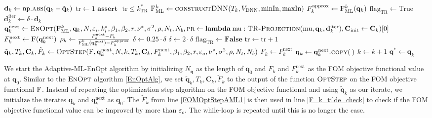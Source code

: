 \begin{algorithm}[H]
\begin{algorithmic}[1]
\State\label{d_kDefAML} $\mathbf{d}_k\gets\mathrm{np.}\Call{abs}{\mathbf{q}_k-\tilde{\mathbf{q}}_k}$
\State $\mathrm{tr}\gets1$
\State $\mathbf{assert}\text{ }\mathrm{tr}\leq k^*_\mathrm{TR}$
\State\label{surrogateDefAML} $\textproc{F$_\mathrm{ML}^k$}\gets \Call{constructDNN}{T_k, V_\mathrm{DNN}, \mathrm{minIn}, \mathrm{maxIn}}$
\State $F^\mathrm{approx}_k\gets \Call{F$_\mathrm{ML}^k$}{\mathbf{q}_k}$
\State $\mathrm{flag}_\mathrm{TR}\gets \mathrm{True}$
\State $\mathbf{d}^\mathrm{iter}_k\gets\delta\cdot\mathbf{d}_k$
\State\label{innerIterationCallAlgo} $\mathbf{q}^\mathrm{next}_k\gets\Call{EnOpt}{\textproc{F$_\mathrm{ML}^k$},\mathbf{q}_k,N,\varepsilon_i,k_i^*,\beta_1, \beta_2,r,\nu^*, \sigma^2, \rho, N_t, N_b, \textproc{pr}\gets\mathbf{lambda}\:\mathrm{mu}:\protect\Call{TR-Projection}{\mathrm{mu}, \mathbf{q}_k, \mathbf{d}^\mathrm{iter}_k}, \mathbf{C}_\mathrm{init}\gets\mathbf{C}_k}[0]$
\State\label{AMLFOMEval2} $F^\mathrm{next}_k\gets \Call{F}{\mathbf{q}^\mathrm{next}_k}$
\State\label{rhoKDef} $\rho_k\gets \frac{F^\mathrm{next}_k-F_k}{\Call{F$_\mathrm{ML}^k$}{\mathbf{q}^\mathrm{next}_k}-F^\mathrm{approx}_k}$
\State $\delta\gets0.25\cdot\delta$
\Else
{}
\State $\delta\gets2\cdot\delta$
\EndIf
\EndIf
{}
\State $\mathrm{flag}_\mathrm{TR}\gets\mathbf{False}$
\EndIf
\EndWhile
\State $\mathrm{tr}\gets\mathrm{tr}+1$
\EndWhile
\State\label{FOMOptStepAML2} $\tilde{\mathbf{q}}_k,T_k,\mathbf{C}_k,\tilde{F}_k\gets\Call{OptStep}{\textproc{F},\mathbf{q}^\mathrm{next}_k,N,k,T_k,\mathbf{C}_k, F^\mathrm{next}_k, \beta_1, \beta_2, r, \varepsilon_o ,\nu^*, \sigma^2, \rho, N_t, N_b}$
\State $F_k \gets F^\mathrm{next}_k$
\State\label{AMLSetqk} $\mathbf{q}_k \gets \mathbf{q}^\mathrm{next}_k\Call{.copy}{\:}$
\State $k\gets k+1$
\EndWhile\label{AMLEnOptWhileEnd}
\State \Return $\mathbf{q}^*\gets\mathbf{q}_k$
\EndFunction
\end{algorithmic}
\end{algorithm}

We start the Adaptive-ML-EnOpt algorithm by initializing $N_\mathbf{q}$ as the length of ${\mathbf{q}_0}$ and $F_k$ and $F^\mathrm{next}_k$ as the FOM objective functional value at $\mathbf{q}_0$. Similar to the $\textproc{EnOpt}$ algorithm \ref{EnOptAlg}, we set $\tilde{\mathbf{q}}_k,T_k,\mathbf{C}_k,\tilde{F}_k$ to the output of the function $\textproc{OptStep}$ on the FOM objective functional $\textproc{F}$. Instead of repeating the optimization step algorithm on the FOM objective functional and using $\tilde{\mathbf{q}}_k$ as our iterate, we initialize the iterates $\mathbf{q}_k$ and $\mathbf{q}^\mathrm{next}_k$ as $\mathbf{q}_0$. The $\tilde{F}_k$ from line \ref{FOMOptStepAML1} is then used in line \ref{F_k_tilde_check} to check if the FOM objective functional value can be improved by more than $\varepsilon_o$. The while-loop is repeated until this is no longer the case.

